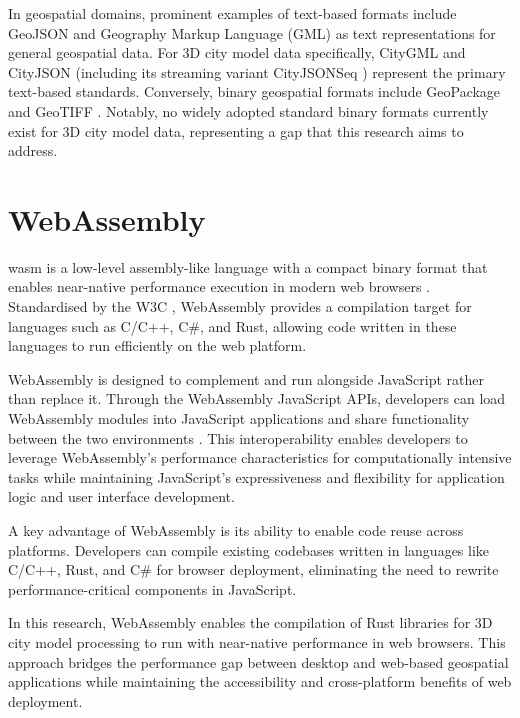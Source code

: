 In geospatial domains, prominent examples of text-based formats include GeoJSON \citep{geojson} and Geography Markup Language (GML) \citep{gml} as text representations for general geospatial data. For 3D city model data specifically, CityGML \citep{CityGML} and CityJSON \citep{cityjson} (including its streaming variant CityJSONSeq \citep{ledoux_2024}) represent the primary text-based standards. Conversely, binary geospatial formats include GeoPackage \citep{geopackage} and GeoTIFF \citep{geotiff}. Notably, no widely adopted standard binary formats currently exist for 3D city model data, representing a gap that this research aims to address.

\section{WebAssembly}
\label{tb:webassembly}
\ac{wasm} is a low-level assembly-like language with a compact binary format that enables near-native performance execution in modern web browsers \citep{WebAssembly}. Standardised by the W3C \citep{WebAssemblyCoreSpecification1, WebAssemblyCoreSpecification2}, WebAssembly provides a compilation target for languages such as C/C++, C\#, and Rust, allowing code written in these languages to run efficiently on the web platform.

WebAssembly is designed to complement and run alongside JavaScript rather than replace it. Through the WebAssembly JavaScript APIs, developers can load WebAssembly modules into JavaScript applications and share functionality between the two environments \citep{WebAssembly}. This interoperability enables developers to leverage WebAssembly's performance characteristics for computationally intensive tasks while maintaining JavaScript's expressiveness and flexibility for application logic and user interface development.

A key advantage of WebAssembly is its ability to enable code reuse across platforms. Developers can compile existing codebases written in languages like C/C++, Rust, and C\# for browser deployment, eliminating the need to rewrite performance-critical components in JavaScript.

In this research, WebAssembly enables the compilation of Rust libraries for 3D city model processing to run with near-native performance in web browsers. This approach bridges the performance gap between desktop and web-based geospatial applications while maintaining the accessibility and cross-platform benefits of web deployment.

